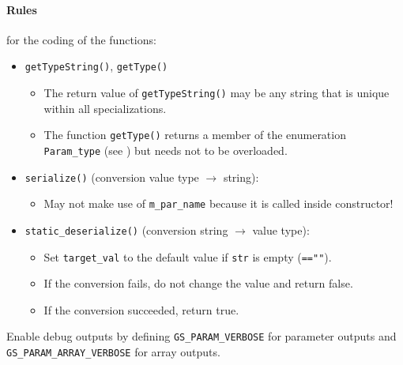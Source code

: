 \paragraph{Rules} for the coding of the functions:
\begin{itemize}
  \item \lstinline|getTypeString()|, \lstinline|getType()|
    \begin{itemize}
      \item The return value of \lstinline|getTypeString()| may be any string that is unique within all specializations.
      \item The function \lstinline|getType()| returns a member of the enumeration \lstinline|Param_type| (see ) but needs not to be overloaded.
    \end{itemize}
  \item \lstinline|serialize()| (conversion value type $\rightarrow$ string):
    \begin{itemize}
      \item May not make use of \lstinline|m_par_name| because it is called inside constructor!
    \end{itemize}
  \item \lstinline|static_deserialize()| (conversion string $\rightarrow$ value type):
    \begin{itemize}
      \item Set \lstinline|target_val| to the default value if \lstinline|str| is empty (\lstinline|==""|).
      \item If the conversion fails, do not change the value and return {\sffamily false}.
      \item If the conversion succeeded, return {\sffamily true}.
    \end{itemize}
\end{itemize}

Enable debug outputs by defining \lstinline|GS_PARAM_VERBOSE| for parameter outputs and \lstinline|GS_PARAM_ARRAY_VERBOSE| for array outputs.


